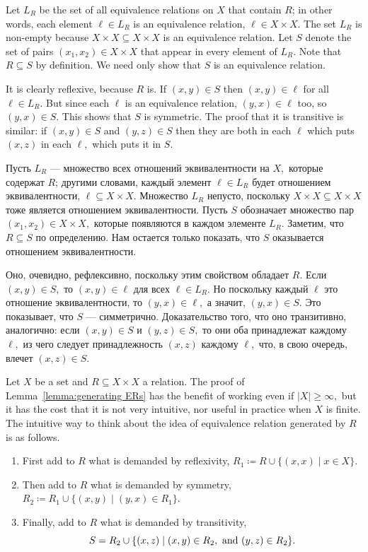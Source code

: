 \documentclass[../main/CT4S-EN-RU]{subfiles}
\begin{document}
\begin{proofENG}
Let $L_R$ be the set of all equivalence relations on $X$ that contain $R$; in other words, each element $\ell\in L_R$ is an equivalence relation, $\ell\in X\times X.$ The set $L_R$ is non-empty because $X\times X\subseteq X\times X$ is an equivalence relation. Let $S$ denote the set of pairs $(x_1,x_2)\in X\times X$ that appear in every element of $L_R.$ Note that $R\subseteq S$ by definition. We need only show that $S$ is an equivalence relation.

It is clearly reflexive, because $R$ is. If $(x,y)\in S$ then $(x,y)\in\ell$ for all $\ell\in L_R.$ But since each $\ell$ is an equivalence relation, $(y,x)\in\ell$ too, so $(y,x)\in S.$ This shows that $S$ is symmetric. The proof that it is transitive is similar: if $(x,y)\in S$ and $(y,z)\in S$ then they are both in each $\ell$ which puts $(x,z)$ in each $\ell,$ which puts it in $S.$
\end{proofENG}

\begin{proofRUS}
Пусть $L_R$ — множество всех отношений эквивалентности на $X,$ которые содержат $R$; другими словами, каждый элемент $\ell\in L_R$ будет отношением эквивалентности, $\ell\subseteq X\times X.$ Множество $L_R$ непусто, поскольку $X\times X\subseteq X\times X$ тоже является отношением эквивалентности. Пусть $S$ обозначает множество пар $(x_1,x_2)\in X\times X,$ которые появляются в каждом элементе $L_R.$ Заметим, что $R\subseteq S$ по определению. Нам остается только показать, что $S$ оказывается отношением эквивалентности.

Оно, очевидно, рефлексивно, поскольку этим свойством обладает $R.$ Если $(x,y)\in S,$ то $(x,y)\in\ell$ для всех $\ell\in L_R.$ Но поскольку каждый $\ell$ это отношение эквивалентности, то $(y,x)\in\ell,$ а значит, $(y,x)\in S.$ Это показывает, что $S$ — симметрично. Доказательство того, что оно транзитивно, аналогично: если $(x,y)\in S$ и $(y,z)\in S,$ то они оба принадлежат каждому $\ell,$ из чего следует принадлежность $(x,z)$ каждому $\ell,$ что, в свою очередь, влечет $(x,z)\in S.$
\end{proofRUS}

\begin{remarkENG}
Let $X$ be a set and $R\subseteq X\times X$ a relation. The proof of Lemma~\ref{lemma:generating ERs} has the benefit of working even if $|X|\geq\infty,$ but it has the cost that it is not very intuitive, nor useful in practice when $X$ is finite. The intuitive way to think about the idea of equivalence relation generated by $R$ is as follows.
\begin{enumerate}
\item First add to $R$ what is demanded by reflexivity, $R_1{\coloneqq}R\cup\{(x,x){\;|\;}x\in X\}.$
\item Then add to $R$ what is demanded by symmetry, $R_2{\coloneqq}R_1\cup\{(x,y){\;|\;}(y,x)\in R_1\}.$
\item Finally, add to $R$ what is demanded by transitivity, $$S=R_2\cup\{(x,z){\;|\;}(x,y)\in R_2, \textnormal{ and } (y,z)\in R_2\}.$$
\end{enumerate}
\end{remarkENG}
\end{document}
